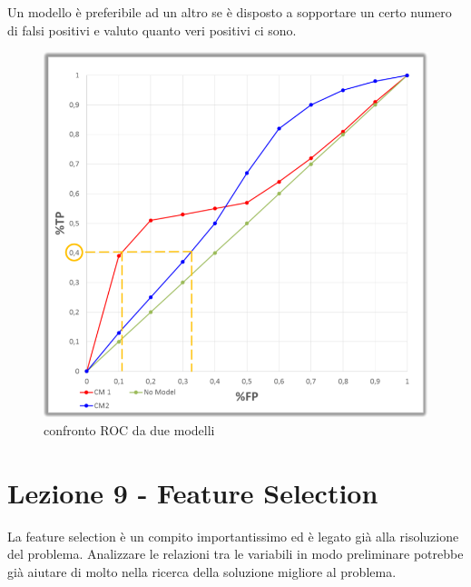 Un modello \`e preferibile ad un altro se \`e disposto a sopportare un certo numero di falsi positivi e valuto quanto veri positivi ci sono. 

\begin{figure}[h!]
	\centering
	\includegraphics[height=0.6 \linewidth]{classification/pict/roc_confronto.png}
	\caption{confronto ROC da due modelli}
\end{figure}
\clearpage
\section{Lezione 9 - Feature Selection}
La feature selection \`e un compito importantissimo ed \`e legato gi\`a alla risoluzione del problema. Analizzare le relazioni tra le variabili in modo preliminare potrebbe gi\`a aiutare di molto nella ricerca della soluzione migliore al problema. 

